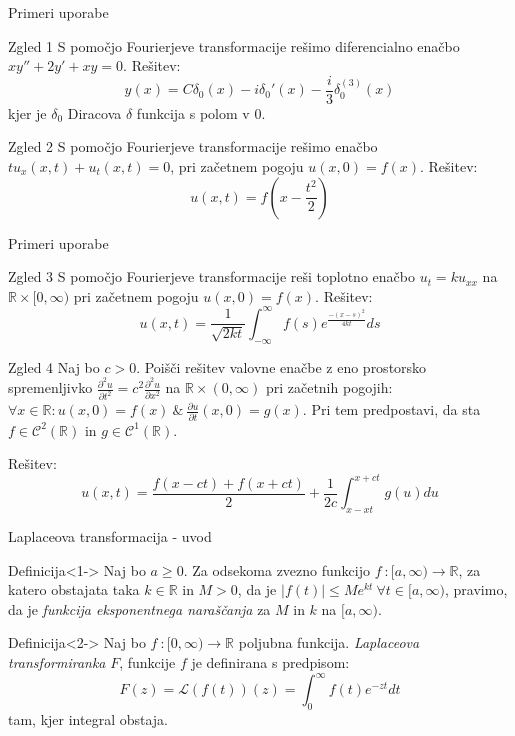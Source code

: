\documentclass[t, 8pt]{beamer} %
\newcommand{\abs}[1]{\ensuremath{\lvert #1 \rvert}}
\newcommand{\mth}[1]{\ensuremath{\mathbb{#1}}}
\newcommand{\R}{\mth{R}}
\newcommand{\pojem}[1]{\emph{#1}}
\newcommand{\map}[3]{\ensuremath{{#1}~: {#2} \rightarrow {#3}}}
\newcommand{\fillblack}[1]{
	\begin{tikzpicture}[remember picture, overlay]
		\node [shift={(0 cm,0cm)}]  at (current page.south west)
		{%
			\begin{tikzpicture}[remember picture, overlay] at (current page.south west)
				\draw [fill=black] (0, 0) -- (0,#1 \paperheight) --
				(\paperwidth,#1 \paperheight) -- (\paperwidth,0) -- cycle ;
			\end{tikzpicture}
		};
		\draw (current page.north west) rectangle (current page.south east);
	\end{tikzpicture}
}
\begin{document}
		\begin{frame}{Primeri uporabe}
			\begin{block}{Zgled 1}
				S pomočjo Fourierjeve transformacije rešimo diferencialno enačbo $xy'' + 2y' + xy = 0$.
				Rešitev: $$y(x) = C\delta_0(x) - i\delta_0'(x) - \frac{i}{3}\delta_0^{(3)}(x)$$ kjer je $\delta_0$ Diracova $\delta$ funkcija s polom v $0$.
			\end{block}
			\begin{block}{Zgled 2}
				S pomočjo Fourierjeve transformacije rešimo enačbo $tu_x(x, t) + u_t(x, t) = 0$, pri začetnem pogoju $u(x, 0) = f(x)$. Rešitev: $$u(x, t) = f(x-\frac{t^2}{2})$$
			\end{block}
		\end{frame}
		
		\begin{frame}{Primeri uporabe}
			\begin{block}{Zgled 3}
				S pomočjo Fourierjeve transformacije reši toplotno enačbo $u_t = ku_{xx}$ na $\R\times[0, \infty)$ pri začetnem pogoju $u(x, 0) = f(x)$. Rešitev: $$u(x, t)=\frac{1}{\sqrt{2kt}}\int_{-\infty}^{\infty} f(s)e^{\frac{-(x-s)^2}{4kt}}ds$$
			\end{block}
			\begin{block}{Zgled 4}
				Naj bo $c > 0$. Poišči rešitev valovne enačbe z eno prostorsko spremenljivko $\frac{\partial^2 u}{\partial t^2} = c^2\frac{\partial^2 u}{\partial x^2}$ na $\R\times (0, \infty)$ pri začetnih pogojih: $\forall x\in \R: u(x, 0) = f(x)~\&~\frac{\partial u}{\partial t}(x, 0) = g(x)$. Pri tem predpostavi, da sta $f\in \mathcal{C}^2(\R)$ in $g\in\mathcal{C}^1(\R)$.
				
				Rešitev: $$u(x, t) = \frac{f(x-ct) + f(x+ct)}{2} + \frac{1}{2c}\int_{x-xt}^{x+ct}g(u)du$$
			\end{block}
		\end{frame}
		
		\begin{frame}{Laplaceova transformacija - uvod}
			\begin{block}{Definicija}<1->
				Naj bo $a\geq 0$. Za odsekoma zvezno funkcijo $\map{f}{[a, \infty)}{\R}$, za katero obstajata taka $k\in \R$ in $M > 0$, da je $\abs{f(t)}\leq Me^{kt}~\forall t\in [a, \infty)$, pravimo, da je \pojem{funkcija eksponentnega naraščanja} za $M$ in $k$ na $[a,\infty)$.
			\end{block}
			\begin{block}{Definicija}<2->
				Naj bo $\map{f}{[0, \infty)}{\R}$ poljubna funkcija. \pojem{Laplaceova transformiranka} $F$, funkcije $f$ je definirana s predpisom: $$F(z) = \mathcal{L}(f(t))(z) = \int_{0}^{\infty}f(t)e^{-zt}dt$$ tam, kjer integral obstaja.
			\end{block}
		\end{frame}
		
\end{document}
